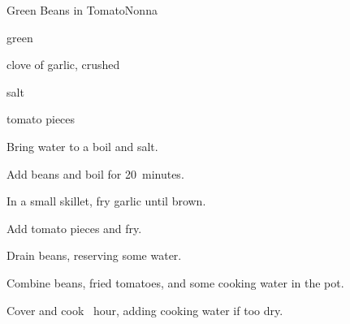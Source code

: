 \begin{recipe}{Green Beans in Tomato}{Nonna}{}

\begin{ingredients}
\item green 
\item clove of garlic, crushed
\item salt
\item tomato pieces
\end{ingredients}

\begin{directions}
\item Bring water to a boil and salt.
\item Add beans and boil for 20~minutes.
\item In a small skillet, fry garlic until brown.
\item Add tomato pieces and fry.
\item Drain beans, reserving some water.
\item Combine beans, fried tomatoes, and some cooking water in the pot.
\item Cover and cook \half~hour, adding cooking water if too dry.
\end{directions}

\end{recipe}
